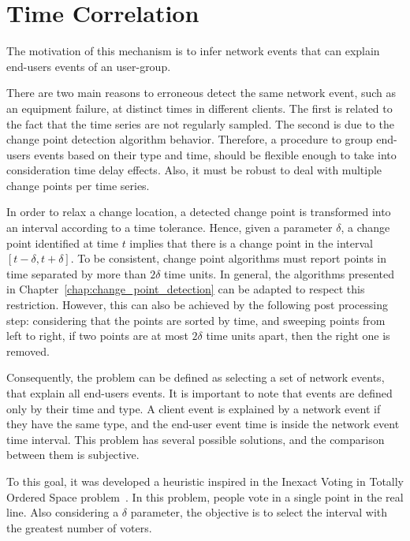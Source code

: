 \section{Time Correlation}
\label{sec:time_correlation}

The motivation of this mechanism is to infer network events that can explain
end-users events of an user-group.

There are two main reasons to erroneous detect the same network event,
such as an
equipment failure, at distinct times in different clients. The first is
related to the fact that the time series are not regularly sampled. The second
is due to the change point detection algorithm behavior.
Therefore, a procedure to group end-users events based on their type and time,
should be flexible enough to take into consideration time delay effects. Also,
it must be robust to deal with multiple change points per time series.

In order to relax a change location, a detected change point is
transformed into an interval according to a time tolerance.
Hence, given a parameter $\delta$, a change point identified at
time $t$ implies that there is a change point in the interval
$[t - \delta, t + \delta]$. To be consistent,
change point algorithms must report points in time separated by more than
$2 \delta$ time units. In general, the algorithms presented in
Chapter~\ref{chap:change_point_detection}
can be adapted to respect this restriction. However, this can also be
achieved by the following post processing step: considering that the points are
sorted by time, and
sweeping points from left to right, if two
points are at most $2 \delta$ time units apart, then the right one is removed.

Consequently, the problem can be defined as selecting a set of network events,
that explain all end-users events. It is important to note that events are
defined only by their time and type.
A client event is explained by a network event if they have the same type,
and the end-user event time is inside the network event time interval.
This problem has several possible solutions, and the comparison between
them is subjective.

To this goal, it was developed a heuristic inspired in the Inexact Voting in
Totally
Ordered Space problem~\cite{voting_algorithms}. In this problem, people
vote in a single point in the real line. Also considering a $\delta$
parameter, the objective is to
select the interval with the greatest number of voters.

